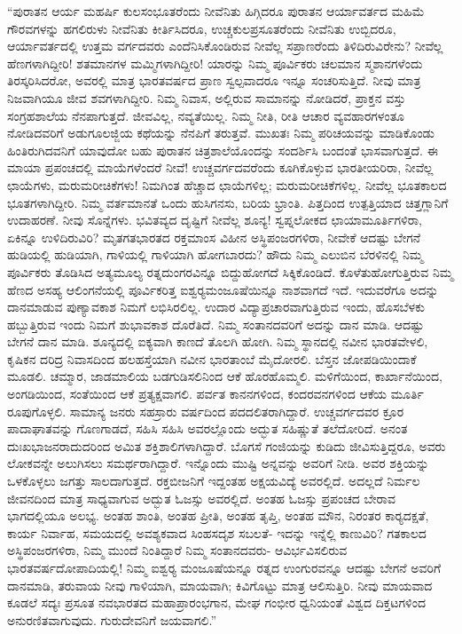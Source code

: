  “ಪುರಾತನ ಆರ್ಯ ಮಹರ್ಷಿ ಕುಲಸಂಭೂತರೆಂದು ನೀವೆನಿತು ಹಿಗ್ಗಿದರೂ ಪುರಾತನ ಆರ್ಯಾವರ್ತದ ಮಹಿಮೆ ಗೌರವಗಳನ್ನು ಹಗಲಿರುಳು ನೀವೆನಿತು ಕೀರ್ತಿಸಿದರೂ, ಉಚ್ಚಕುಲಪ್ರಸೂತರೆಂದು ನೀವೆನಿತು ಉಬ್ಬಿದರೂ, ಆರ್ಯಾವರ್ತದಲ್ಲಿ ಉತ್ತಮ ವರ್ಗದವರು ಎಂದೆನಿಸಿಕೊಂಡಿರುವ ನೀವೆಲ್ಲ ಸಪ್ರಾಣರೆಂದು ತಿಳಿದಿರುವಿರೇನು? ನೀವೆಲ್ಲ ಹೆಣಗಳಾಗಿದ್ದೀರಿ! ಶತಮಾನಗಳ ಮಮ್ಮಿಗಳಾಗಿದ್ದೀರಿ! ಯಾರನ್ನು ನಿಮ್ಮ ಪೂರ್ವಿಕರು ಚಲಮಾನ ಸ್ಮಶಾನಗಳೆಂದು ತಿರಸ್ಕರಿಸಿದರೋ, ಅವರಲ್ಲಿ ಮಾತ್ರ ಭಾರತವರ್ಷದ ಪ್ರಾಣ ಸ್ವಲ್ಪವಾದರೂ ಇನ್ನೂ ಸಂಚರಿಸುತ್ತಿದೆ. ನೀವು ಮಾತ್ರ ನಿಜವಾಗಿಯೂ ಜೀವ ಶವಗಳಾಗಿದ್ದೀರಿ. ನಿಮ್ಮ ನಿವಾಸ, ಅಲ್ಲಿರುವ ಸಾಮಾನನ್ನು ನೋಡಿದರೆ, ಪ್ರಾಕ್ತನ ವಸ್ತು ಸಂಗ್ರಹಶಾಲೆಯ ನೆನಪಾಗುತ್ತದೆ. ಜೀವವಿಲ್ಲ, ನವ್ಯತೆಯಿಲ್ಲ. ನಿಮ್ಮ ನೀತಿ, ರೀತಿ ಆಚಾರ ವ್ಯವಹಾರಗಳಂತೂ ನೋಡಿದವರಿಗೆ ಅಡುಗೂಲಜ್ಜಿಯ ಕಥೆಯನ್ನು ನೆನಪಿಗೆ ತರುತ್ತವೆ. ಮುಖತಃ ನಿಮ್ಮ ಪರಿಚಯವನ್ನು ಮಾಡಿಕೊಂಡು ಹಿಂತಿರುಗಿದವನಿಗೆ ಯಾವುದೋ ಬಹು ಪುರಾತನ ಚಿತ್ರಶಾಲೆಯೊಂದನ್ನು ಸಂದರ್ಶಿಸಿ ಬಂದಂತೆ ಭಾಸವಾಗುತ್ತದೆ. ಈ ಮಾಯಾ ಪ್ರಪಂಚದಲ್ಲಿ ಮಾಯೆಗಳೆಂದರೆ ನೀವೆ! ಉಚ್ಚವರ್ಗದವರೆಂದು ಕೂಗಿಕೊಳ್ಳುವ ಭಾರತೀಯರಿರಾ, ನೀವೆಲ್ಲ ಛಾಯೆಗಳು, ಮರುಮರೀಚಿಕೆಗಳು! ನಿಮಗಿಂತ ಹೆಚ್ಚಾದ ಛಾಯೆಗಳಿಲ್ಲ; ಮರುಮರೀಚಿಕೆಗಳಿಲ್ಲ. ನೀವೆಲ್ಲ ಭೂತಕಾಲದ ಭೂತಗಳಾಗಿದ್ದೀರಿ. ನಿಮ್ಮ ವರ್ತಮಾನತೆ ಒಂದು ಹುಸಿಗನಸು, ಬರಿಯ ಭ್ರಾಂತಿ. ಪಿತ್ತದಿಂದ ಉತ್ಪತ್ತಿಯಾದ ಚಿತ್ತಗ್ಲಾನಿಗೆ ಉದಾಹರಣೆ. ನೀವು ಸೊನ್ನೆಗಳು. ಭವಿತವ್ಯದ ದೃಷ್ಟಿಗೆ ನೀವೆಲ್ಲ ಶೂನ್ಯ! ಸ್ವಪ್ನಲೋಕದ ಛಾಯಾಮೂರ್ತಿಗಳಿರಾ, ಏಕಿನ್ನೂ ಉಳಿದಿರುವಿರಿ? ಮೃತಗತಭಾರತದ ರಕ್ತಮಾಂಸ ವಿಹೀನ ಅಸ್ಥಿಪಂಜರಗಳಿರಾ, ನೀವೇಕೆ ಆದಷ್ಟು ಬೇಗನೆ ಹುಡಿಯಲ್ಲಿ ಹುಡಿಯಾಗಿ, ಗಾಳಿಯಲ್ಲಿ ಗಾಳಿಯಾಗಿ ಹೋಗಬಾರದು? ಹೌದು ನಿಮ್ಮ ಎಲುಬಿನ ಬೆರಳಿನಲ್ಲಿ ನಿಮ್ಮ ಪೂರ್ವಿಕರು ತೊಡಿಸಿದ ಅತ್ಯಮೂಲ್ಯ ರತ್ನದುಂಗರವಿನ್ನೂ ಬಿದ್ದುಹೋಗದೆ ಸಿಕ್ಕಿಕೊಂಡಿದೆ. ಕೊಳೆತುಹೋಗುತ್ತಿರುವ ನಿಮ್ಮ ಹೆಣದ ಅಸಹ್ಯ ಆಲಿಂಗನೆಯಲ್ಲಿ ಪೂರ್ವಿಕರಿತ್ತ ಐಶ್ವರ‍್ಯಮಂಜೂಷೆಯಿನ್ನೂ ನಾಶವಾಗದೆ ಇದೆ. ಇದುವರೆಗೂ ಅದನ್ನು ದಾನಮಾಡುವ ಪುಣ್ಯಾವಕಾಶ ನಿಮಗೆ ಲಭಿಸಿರಲಿಲ್ಲ. ಉದಾರ ವಿದ್ಯಾಪ್ರಚಾರವಾಗುತ್ತಿರುವ ಇಂದು, ಹೊಸಬೆಳಕು ಹಬ್ಬುತ್ತಿರುವ ಇಂದು ನಿಮಗೆ ಶುಭಾವಕಾಶ ದೊರೆತಿದೆ. ನಿಮ್ಮ ಸಂತಾನದವರಿಗೆ ಅದನ್ನು ದಾನ ಮಾಡಿ. ಆದಷ್ಟು ಬೇಗನೆ ದಾನ ಮಾಡಿ. ಶೂನ್ಯದಲ್ಲಿ ಐಕ್ಯವಾಗಿ ಕಾಣದೆ ತೊಲಗಿ ಹೋಗಿ. ನಿಮ್ಮ ಸ್ಥಾನದಲ್ಲಿ ನವೀನ ಭಾರತವೇಳಲಿ, ಕೃಷಿಕನ ದರಿದ್ರ ನಿವಾಸದಿಂದ ಹಲಹಸ್ತೆಯಾಗಿ ನವೀನ ಭಾರತಾಂಬೆ ಮೈದೋರಲಿ. ಬೆಸ್ತನ ಜೋಪಡಿಯಿಂದಾಕೆ ಮೂಡಲಿ. ಚಮ್ಮಾರ, ಜಾಡಮಾಲಿಯ ಬಡಗುಡಿಸಲಿನಿಂದ ಆಕೆ ಹೊರಹೊಮ್ಮಲಿ. ಮಳಿಗೆಯಿಂದ, ಕಾರ್ಖಾನೆಯಿಂದ, ಅಂಗಡಿಯಿಂದ, ಸಂತೆಯಿಂದ ಆಕೆ ಪ್ರತ್ಯಕ್ಷವಾಗಲಿ. ಪರ್ವತ ಕಾನನಗಳಿಂದ, ಕಂದರವನಗಳಿಂದ ಆಕೆಯ ಮೂರ್ತಿ ರೂಪುಗೊಳ್ಳಲಿ. ಸಾಮಾನ್ಯ ಜನರು ಸಹಸ್ರಾರು ವರ್ಷದಿಂದ ಪದದಲಿತರಾಗಿದ್ದಾರೆ. ಉಚ್ಚವರ್ಗದವರ ಕ್ರೂರ ಪಾದಾಘಾತವನ್ನು ಗೊಣಗಾಡದೆ, ಸಹಿಸಿ ಸಹಿಸಿ ಅವರಲ್ಲೊಂದು ಅದ್ಭುತ ಸಹಿಷ್ಣುತೆ ತಲೆದೋರಿದೆ. ಅನಂತ ದುಃಖಭಾಜನರಾದುದರಿಂದ ಅಮಿತ ಶಕ್ತಿಶಾಲಿಗಳಾಗಿದ್ದಾರೆ. ಬೊಗಸೆ ಗಂಜಿಯನ್ನು ಕುಡಿದು ಜೀವಿಸುತ್ತಿದ್ದರೂ, ಅವರು ಲೋಕವನ್ನೇ ಅಲುಗಿಸಲು ಸಮರ್ಥರಾಗಿದ್ದಾರೆ. ಇನ್ನೊಂದು ಮುಷ್ಟಿ ಅನ್ನವನ್ನು ಅವರಿಗೆ ನೀಡಿ. ಅವರ ಶಕ್ತಿಯನ್ನು ಒಳಕೊಳ್ಳಲು ಜಗತ್ತು ಸಾಲದಾಗುತ್ತದೆ. ರಕ್ತಬೀಜನಿಗೆ ಇದ್ದಂತಹ ಅಕ್ಷಯವಿದ್ಯೆ ಅವರಲ್ಲಿದೆ. ಅದಲ್ಲದೆ ನಿರ್ಮಲ ಜೀವನದಿಂದ ಮಾತ್ರ ಸಾಧ್ಯವಾಗುವ ಅದ್ಭುತ ಓಜಸ್ಸು ಅವರಲ್ಲಿದೆ. ಅಂತಹ ಓಜಸ್ಸು ಪ್ರಪಂಚದ ಬೇರಾವ ಭಾಗದಲ್ಲಿಯೂ ಅಲಭ್ಯ. ಅಂತಹ ಶಾಂತಿ, ಅಂತಹ ಪ್ರೀತಿ, ಅಂತಹ ತೃಪ್ತಿ, ಅಂತಹ ಮೌನ, ನಿರಂತರ ಕಾರ‍್ಯದಕ್ಷತೆ, ಕಾರ್ಯ ನಿರ್ವಾಹ, ಸಮಯದಲ್ಲಿ ಅವಶ್ಯಕವಾದ ಸಿಂಹಸದೃಶ ಸಬಲತೆ- ಇದನ್ನು ಇನ್ನೆಲ್ಲಿ ಕಾಣುವಿರಿ? ಗತಕಾಲದ ಅಸ್ಥಿಪಂಜರಗಳಿರಾ, ನಿಮ್ಮ ಮುಂದೆ ನಿಂತಿದ್ದಾರೆ ನಿಮ್ಮ ಸಂತಾನದವರು- ಆವಿರ್ಭವಿಸಲಿರುವ ಭಾರತವರ್ಷದೋಪಾದಿಯಲ್ಲಿ! ನಿಮ್ಮ ಐಶ್ವರ‍್ಯ ಮಂಜೂಷೆಯನ್ನೂ ರತ್ನದ ಉಂಗುರವನ್ನೂ ಆದಷ್ಟು ಬೇಗನೆ ಅವರಿಗೆ ದಾನಮಾಡಿ, ತರುವಾಯ ನೀವು ಗಾಳಿಯಾಗಿ, ಮಾಯವಾಗಿ; ಕಿವಿಗೊಟ್ಟು ಮಾತ್ರ ಆಲಿಸುತ್ತಿರಿ. ನೀವು ಮಾಯವಾದ ಕೂಡಲೆ ಸದ್ಯಃ ಪ್ರಸೂತ ನವಭಾರತದ ಮಹಾಪ್ರಾರಂಭಗಾನ, ಮೇಘ ಗಂಭೀರ ಧ್ವನಿಯಂತೆ ವಿಶ್ವದ ದಿಕ್ತಟಗಳಿಂದ ಅನುರಣಿತವಾಗುವುದು. ಗುರುದೇವನಿಗೆ ಜಯವಾಗಲಿ.” 

